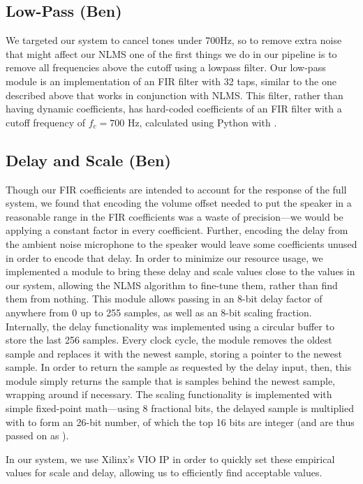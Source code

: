 \documentclass{fpgairpods}
\begin{document}
\subsection{Low-Pass (Ben)}
We targeted our system to cancel tones under 700Hz, so to remove extra noise that might affect our NLMS one of the first things we do in our pipeline is to remove all frequencies above the cutoff using a lowpass filter. Our low-pass module is an implementation of an FIR filter with 32 taps, similar to the one described above that works in conjunction with NLMS. This filter, rather than having dynamic coefficients, has hard-coded coefficients of an FIR filter with a cutoff frequency of $f_c = 700$ Hz, calculated using Python with .

\subsection{Delay and Scale (Ben)}
Though our FIR coefficients are intended to account for the response of the full system, we found that encoding the volume offset needed to put the speaker in a reasonable range in the FIR coefficients was a waste of precision---we would be applying a constant factor in every coefficient. Further, encoding the delay from the ambient noise microphone to the speaker would leave some coefficients unused in order to encode that delay. In order to minimize our resource usage, we implemented a module to bring these delay and scale values close to the values in our system, allowing the NLMS algorithm to fine-tune them, rather than find them from nothing. This module allows passing in an 8-bit delay factor of anywhere from 0 up to 255 samples, as well as an 8-bit scaling fraction. Internally, the delay functionality was implemented using a circular buffer to store the last 256 samples. Every clock cycle, the module removes the oldest sample and replaces it with the newest sample, storing a pointer to the newest sample. In order to return the sample as requested by the delay input, then, this module simply returns the sample that is  samples behind the newest sample, wrapping around if necessary. The scaling functionality is implemented with simple fixed-point math---using 8 fractional bits, the delayed sample is multiplied with  to form an 26-bit number, of which the top 16 bits are integer (and are thus passed on as ).

In our system, we use Xilinx's VIO IP in order to quickly set these empirical values for scale and delay, allowing us to efficiently find acceptable values.
\end{document}
